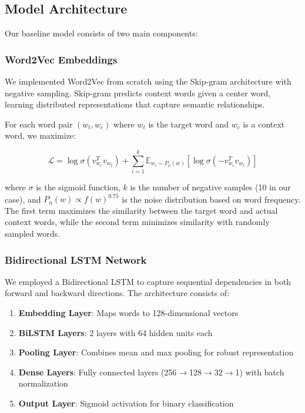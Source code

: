 \documentclass[11pt]{article}
\begin{document}
\subsection{Model Architecture}
Our baseline model consists of two main components:

\subsubsection{Word2Vec Embeddings}
We implemented Word2Vec from scratch using the Skip-gram architecture with negative sampling. Skip-gram predicts context words given a center word, learning distributed representations that capture semantic relationships.

\noindent For each word pair $(w_t, w_c)$ where $w_t$ is the target word and $w_c$ is a context word, we maximize:

\begin{equation}
\mathcal{L} = \log \sigma(v_{w_c}^T v_{w_t}) + \sum_{i=1}^{k} \mathbb{E}_{w_i \sim P_n(w)} [\log \sigma(-v_{w_i}^T v_{w_t})]
\end{equation}

\noindent where $\sigma$ is the sigmoid function, $k$ is the number of negative samples (10 in our case), and $P_n(w) \propto f(w)^{0.75}$ is the noise distribution based on word frequency. The first term maximizes the similarity between the target word and actual context words, while the second term minimizes similarity with randomly sampled words.

\subsubsection{Bidirectional LSTM Network}
We employed a Bidirectional LSTM to capture sequential dependencies in both forward and backward directions. The architecture consists of:

\begin{enumerate}
    \item \textbf{Embedding Layer}: Maps words to 128-dimensional vectors
    \item \textbf{BiLSTM Layers}: 2 layers with 64 hidden units each
    \item \textbf{Pooling Layer}: Combines mean and max pooling for robust representation
    \item \textbf{Dense Layers}: Fully connected layers (256$\rightarrow$128$\rightarrow$32$\rightarrow$1) with batch normalization
    \item \textbf{Output Layer}: Sigmoid activation for binary classification
\end{enumerate}
\end{document}

